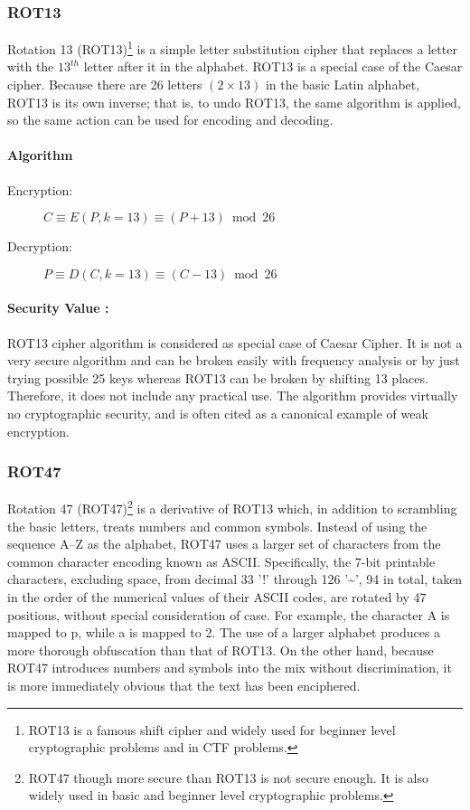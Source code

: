 \documentclass[british]{article}
\begin{document}
\subsubsection{ROT13}

Rotation 13 (ROT13)\footnote{ROT13 is a famous shift cipher and widely used for beginner level
cryptographic problems and in CTF problems.} is a simple letter substitution cipher that replaces a letter with
the $13^{th}$ letter after it in the alphabet. ROT13 is a special
case of the Caesar cipher. Because there are 26 letters $(2\times13)$
in the basic Latin alphabet, ROT13 is its own inverse; that is, to
undo ROT13, the same algorithm is applied, so the same action can
be used for encoding and decoding.

\paragraph{Algorithm}
\begin{description}
\item [{Encryption:}] $C \equiv E(P,k=13) \equiv (P+13) \bmod 26$
\item [{Decryption:}] $P \equiv D(C,k=13) \equiv (C-13) \bmod 26$
\end{description}

\paragraph{Security Value : }

ROT13 cipher algorithm is considered as special case of Caesar Cipher.
It is not a very secure algorithm and can be broken easily with frequency
analysis or by just trying possible 25 keys whereas ROT13 can be broken
by shifting 13 places. Therefore, it does not include any practical
use. The algorithm provides virtually no cryptographic security, and
is often cited as a canonical example of weak encryption.

\subsubsection{ROT47}

Rotation 47 (ROT47)\footnote{ROT47 though more secure than ROT13 is not secure enough. It is also
widely used in basic and beginner level cryptographic problems.} is a derivative of ROT13 which, in addition to scrambling the basic
letters, treats numbers and common symbols. Instead of using the sequence
A--Z as the alphabet, ROT47 uses a larger set of characters from
the common character encoding known as ASCII. Specifically, the 7-bit
printable characters, excluding space, from decimal 33 '!' through
126 '\textasciitilde ', 94 in total, taken in the order of the numerical
values of their ASCII codes, are rotated by 47 positions, without
special consideration of case. For example, the character A is mapped
to p, while a is mapped to 2. The use of a larger alphabet produces
a more thorough obfuscation than that of ROT13. On the other hand,
because ROT47 introduces numbers and symbols into the mix without
discrimination, it is more immediately obvious that the text has been
enciphered.
\end{document}
